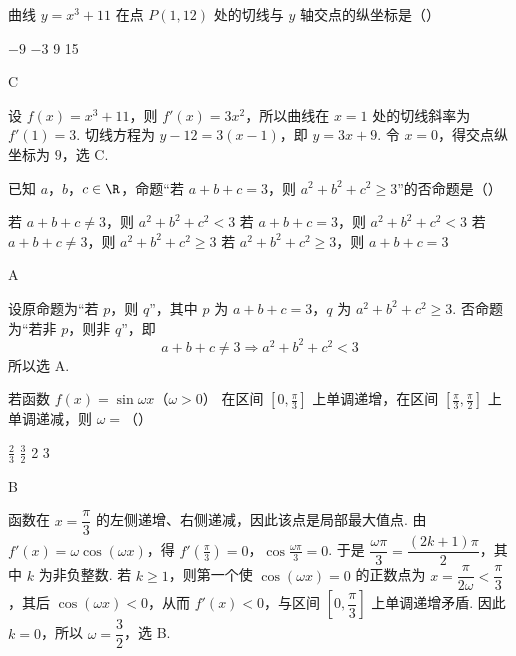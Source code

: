 \begin{problem}
曲线 \( y = x^{3} + 11 \) 在点 \( P(1,12) \) 处的切线与 \( y \) 轴交点的纵坐标是（\quad）

\choices
    {\(-9\)}
    {\(-3\)}
    {9}
    {15}
\end{problem}

\begin{answer}
C
\end{answer}

\begin{solution}
设 \(f(x)=x^3+11\)，则 \(f'(x)=3x^2\)，所以曲线在 \(x=1\) 处的切线斜率为 \(f'(1)=3\). 切线方程为 \(y-12=3(x-1)\)，即 \(y=3x+9\). 令 \(x=0\)，得交点纵坐标为 \(9\)，选 C.
\end{solution}

\begin{problem}
已知 \(a\)，\(b\)，\(c \in \R\)，命题“若 \(a + b + c = 3\)，则 \(a^2 + b^2 + c^2 \geqslant 3\)”的否命题是（\quad）

\choices
    {若 \(a + b + c \neq 3\)，则 \(a^2 + b^2 + c^2 < 3\)}
    {若 \(a + b + c = 3\)，则 \(a^2 + b^2 + c^2 < 3\)}
    {若 \(a + b + c \neq 3\)，则 \(a^2 + b^2 + c^2 \geqslant 3\)}
    {若 \(a^2 + b^2 + c^2 \geqslant 3\)，则 \(a + b + c = 3\)}
\end{problem}

\begin{answer}
A
\end{answer}

\begin{solution}
设原命题为“若 \(p\)，则 \(q\)”，其中 \(p\) 为 \(a+b+c=3\)，\(q\) 为 \(a^2+b^2+c^2\geqslant3\). 否命题为“若非 \(p\)，则非 \(q\)”，即
\[
a+b+c\neq3\Longrightarrow a^2+b^2+c^2<3
\]
所以选 A.
\end{solution}

\begin{problem}
若函数 \(f(x) = \sin \omega x\)（\(\omega > 0\)） 在区间 \(\left[0, \frac{\pi}{3}\right]\) 上单调递增，在区间 \(\left[\frac{\pi}{3}, \frac{\pi}{2}\right]\) 上单调递减，则 \(\omega =\)（\quad）

\choices
    {\(\frac{2}{3}\)}
    {\(\frac{3}{2}\)}
    {2}
    {3}
\end{problem}

\begin{answer}
B
\end{answer}

\begin{solution}
函数在 \(x=\dfrac{\pi}{3}\) 的左侧递增、右侧递减，因此该点是局部最大值点. 由 \(f'(x)=\omega\cos(\omega x)\)，得
\(f'\left(\frac{\pi}{3}\right)=0\)，\(\cos\frac{\omega\pi}{3}=0\).
于是 \(\dfrac{\omega\pi}{3}=\dfrac{(2k+1)\pi}{2}\)，其中 \(k\) 为非负整数. 若 \(k\geqslant1\)，则第一个使 \(\cos(\omega x)=0\) 的正数点为 \(x=\dfrac{\pi}{2\omega}<\dfrac{\pi}{3}\)，其后 \(\cos(\omega x)<0\)，从而 \(f'(x)<0\)，与区间 \(\left[0,\dfrac{\pi}{3}\right]\) 上单调递增矛盾. 因此 \(k=0\)，所以 \(\omega=\dfrac32\)，选 B.
\end{solution}

